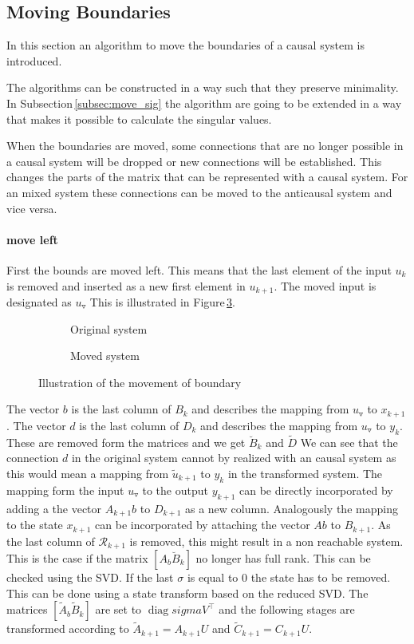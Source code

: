 \documentclass[doctype=mastersthesis,BCOR=15mm,biblatex]{ldvbook}%
\DeclareMathOperator{\diag}{diag}
\newcommand{\R}{\mathcal{R}} %
\newcommand{\m}{\triangledown} %
\begin{document}
\subsection{Moving Boundaries}
In this section an algorithm to move the boundaries of a causal system is introduced.

The algorithms can be constructed in a way such that they preserve minimality.
In Subsection\,\ref{subsec:move_sig} the algorithm are going to be extended in a way that makes it possible to calculate the singular values.

When the boundaries are moved, some connections that are no longer possible in a causal system will be dropped or new connections will be established.
This changes the parts of the matrix that can be represented with a causal system.
For an mixed system these connections can be moved to the anticausal system and vice versa.
\paragraph{move left}
First the bounds are moved left.
This means that the last element of the input $u_k$ is removed and inserted as a new first element in $u_{k+1}$. 
The moved input is designated as $u_\m$
This is illustrated in Figure\,\ref{fig:move_left}.
\begin{figure}[htb]
	\centering
	
	\begin{subfigure}[b]{0.45\textwidth}
		\caption{Original system}
		\label{fig:move_left_a}
	\end{subfigure}
	\hspace{0.8cm}
	\begin{subfigure}[b]{0.45\textwidth}
		\caption{Moved system}
		\label{fig:move_left_b}
	\end{subfigure}
	\caption{Illustration of the movement of boundary}
	\label{fig:move_left}
\end{figure}
The vector $b$ is the last column of $B_k$ and describes the mapping from $u_\m$ to $x_{k+1}$. The vector $d$ is the last column of $D_k$ and describes the mapping from $u_\m$ to $y_{k}$.
These are removed form the matrices and we get $\breve{B}_k$ and $\tilde{D}$
We can see that the connection $d$ in the original system cannot by realized with an causal system as this would mean a mapping from $\tilde{u}_{k+1}$ to $y_k$ in the transformed system.
The mapping form the input $u_\m$ to the output $y_{k+1}$ can be directly incorporated by adding a the vector $A_{k+1}b$ to $D_{k+1}$ as a new column.
Analogously the mapping to the state $x_{k+1}$ can be incorporated by attaching the vector $Ab$ to $B_{k+1}$.
As the last column of $\R_{k+1}$ is removed, this might result in a non reachable system.
This is the case if the matrix $[A_b \breve{B}_k]$ no longer has full rank.
This can be checked using the SVD. 
If the last $\sigma$ is equal to $0$ the state has to be removed. 
This can be done using a state transform based on the reduced SVD. 
The matrices $[\tilde{A}_b \tilde{B}_k]$ are set to $\diag{sigma} V^\top$ and 
the following stages are transformed according to $\tilde{A}_{k+1} = A_{k+1}U$ and $\tilde{C}_{k+1} = C_{k+1} U$.
 
\end{document}
